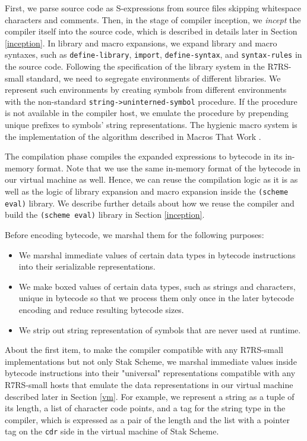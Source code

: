 \documentclass[sigplan, anonymous, review]{acmart}
\begin{document}
First, we parse source code as S-expressions from source
files skipping whitespace characters and comments.
Then, in the stage of compiler inception, we \textit{incept} the compiler
itself into the source code, which is described in details later in
Section \ref{inception}.
In library and macro expansions, we expand library and macro
syntaxes, such as \texttt{define-library}, \texttt{import},
\texttt{define-syntax}, and \texttt{syntax-rules} in the source code.
Following the specification of the library system in the R7RS-small
standard, we need to segregate environments of different libraries.
We represent such environments by creating symbols from
different environments with the non-standard
\texttt{string->uninterned-symbol} procedure.
If the procedure is not available in the compiler host, we emulate
the procedure by prepending unique prefixes to symbols' string
representations.
The hygienic macro system is the implementation of the
algorithm described in Macros That Work \cite{macrosthatwork}.

The compilation phase compiles the expanded expressions to
bytecode in its in-memory format. Note that we use the same
in-memory format of the bytecode in our virtual machine as well.
Hence, we can reuse the compilation logic as it is
as well as the logic of library expansion and macro expansion inside
the \texttt{(scheme eval)} library.
We describe further details about how we reuse the compiler and build
the \texttt{(scheme eval)} library in Section \ref{inception}.

Before encoding bytecode, we marshal them for the following purposes:

\begin{itemize}
  \item We marshal immediate values of certain data types in bytecode
    instructions into their serializable representations.
  \item We make boxed values of certain data types, such as strings and
    characters, unique in bytecode so that we process them only once
    in the later bytecode encoding and reduce resulting bytecode sizes.
  \item We strip out string representation of symbols that are never used
    at runtime.
\end{itemize}

About the first item, to make the compiler compatible with any R7RS-small
implementations but not only Stak Scheme, we marshal immediate values
inside bytecode instructions into their "universal"
representations compatible with any R7RS-small hosts that emulate
the data representations in our virtual machine
described later in Section \ref{vm}.
For example, we represent a string as a tuple of its length, a list of
character code points, and a tag for the string type in the compiler,
which is expressed as a pair of the length and the list
with a pointer tag on the \texttt{cdr} side in the virtual
machine of Stak Scheme.
\end{document}
